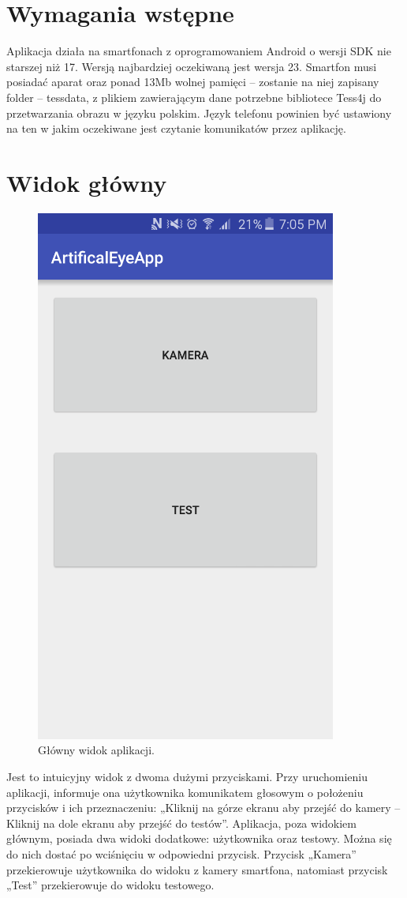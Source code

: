 \documentclass[eng,oneside]{mgr}
\begin{document}
\section {Wymagania wstępne}
Aplikacja działa na smartfonach z oprogramowaniem Android o wersji SDK nie starszej niż 17. Wersją najbardziej oczekiwaną jest wersja 23. Smartfon musi posiadać aparat oraz ponad 13Mb wolnej pamięci – zostanie na niej zapisany folder – tessdata, z plikiem zawierającym dane potrzebne bibliotece Tess4j do przetwarzania obrazu w języku polskim. Język telefonu powinien być ustawiony na ten w jakim oczekiwane jest czytanie komunikatów przez aplikację. 
\section {Widok główny}
\begin{figure}[htbp]
\centering
\includegraphics{glownywidok.png}
\caption{Główny widok aplikacji.}\par\medskip
\end{figure}
Jest to intuicyjny widok z dwoma dużymi przyciskami. Przy uruchomieniu aplikacji, informuje ona użytkownika komunikatem głosowym o położeniu przycisków i ich przeznaczeniu: „Kliknij na górze ekranu aby przejść do kamery – Kliknij na dole ekranu aby przejść do testów”. Aplikacja, poza widokiem głównym, posiada dwa widoki dodatkowe: użytkownika oraz testowy. Można się do nich dostać po wciśnięciu w odpowiedni przycisk. Przycisk „Kamera” przekierowuje użytkownika do widoku z kamery smartfona, natomiast przycisk „Test” przekierowuje do widoku testowego.
\end{document}
